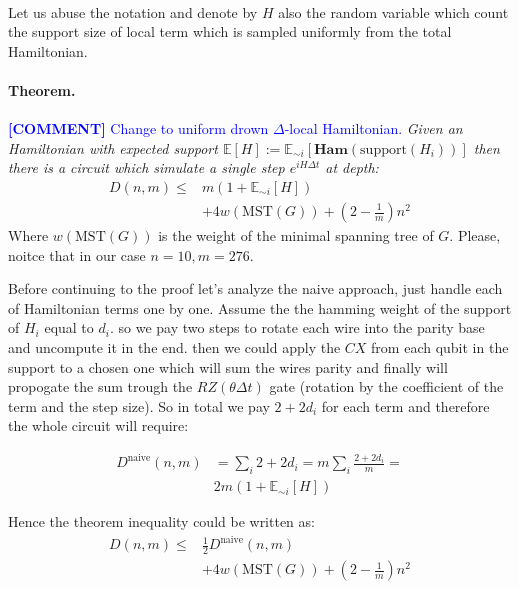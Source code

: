 \documentclass{article}
\newcommand{\commentt}[1]{\textcolor{blue}{ \textbf{[COMMENT]} #1}}
\newcommand{\ctt}[1]{\commentt{#1}}
\begin{document}
\paragraph{}
Let us abuse the notation and denote by $H$ also the random variable which count the support size of local term which is sampled uniformly from the total Hamiltonian. 
\paragraph{Theorem.} \ctt{Change to uniform drown $\Delta$-local Hamiltonian.} \textit{ Given an Hamiltonian with expected support \(\mathbb{E}[H] := \mathbb{E}_{\sim i}\left[ \textbf{Ham}( \text{support}(H_i)) \right]\) then there is a circuit which simulate a single step \(e^{iH \Delta t}\) at depth:}
\begin{equation*}
  \begin{split}
    D\left(n,m\right) \leq & m \left( 1 + \mathbb{E}_{\sim i}[H] \right)   \\
    & + 4w \left( \text{MST}\left(G\right) \right) + \left(2 - \frac{1}{m}\right)n^2
  \end{split}    
\end{equation*}  Where  \(w \left( \text{MST}\left(G\right) \right) \) is the weight of the minimal spanning tree of \(G\). Please, noitce that in our case \(n=10, m=276\).

Before continuing to the proof let's analyze the naive approach, just handle each of Hamiltonian terms one by one. Assume the the hamming weight of the support of \(H_i\) equal to \(d_i\). so we pay two steps to rotate each wire into the parity base and uncompute it in the end. then we could apply the \(CX\) from each qubit in the support to a chosen one which will sum the wires parity and finally will propogate the sum trough the \(RZ\left(\theta \Delta t \right) \) gate (rotation by the coefficient of the term and the step size). So in total we pay \(2 + 2d_i\) for each term and therefore the whole circuit will require: 

\begin{equation*}
  \begin{split}
    D^{\text{naive}}\left(n,m\right) & = \sum_{i}{2 + 2d_i} = m\sum_{i}{\frac{2 + 2d_i}{m}} = \\ & 2m \left( 1 + \mathbb{E}_{\sim i}[H] \right)  
  \end{split}
\end{equation*}

Hence the theorem inequality could be written as:
\begin{equation*}
  \begin{split}
    D\left(n,m\right) \leq & \frac{1}{2} D^{\text{naive}} \left(n,m\right) \\ & + 4w \left( \text{MST}\left(G\right) \right) + \left(2 - \frac{1}{m}\right)n^2
  \end{split}    
\end{equation*} 
\end{document}
